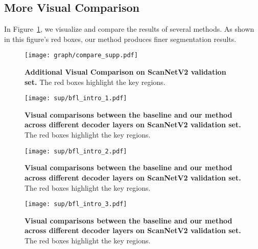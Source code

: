 \subsection{More Visual Comparison}
In Figure~\ref{VisualizationComparison}, we visualize and compare the results of several methods. As shown in this figure's red boxes, our method produces finer segmentation results.
\begin{figure}[!ht]
  \begin{center}
      \texttt{[image: graph/compare\_supp.pdf]}
      \caption{\textbf{Additional Visual Comparison on ScanNetV2 validation set.} The red boxes highlight the key regions.
      }
      \label{VisualizationComparison}
  \end{center}
\end{figure}

\begin{figure}[!ht]
  \begin{center}
      \texttt{[image: sup/bfl\_intro\_1.pdf]}
      \caption{\textbf{Visual comparisons between the baseline and our method across different decoder layers on ScanNetV2 validation set.} The red boxes highlight the key regions.
      }
      \label{VisualizationComparison1}
  \end{center}
\end{figure}
\begin{figure}[!ht]
  \begin{center}
      \texttt{[image: sup/bfl\_intro\_2.pdf]}
      \caption{\textbf{Visual comparisons between the baseline and our method across different decoder layers on ScanNetV2 validation set.} The red boxes highlight the key regions.
      }
      \label{VisualizationComparison2}
  \end{center}
\end{figure}
\begin{figure}[!ht]
  \begin{center}
      \texttt{[image: sup/bfl\_intro\_3.pdf]}
      \caption{\textbf{Visual comparisons between the baseline and our method across different decoder layers on ScanNetV2 validation set.} The red boxes highlight the key regions.
      }
      \label{VisualizationComparison3}
  \end{center}
\end{figure}